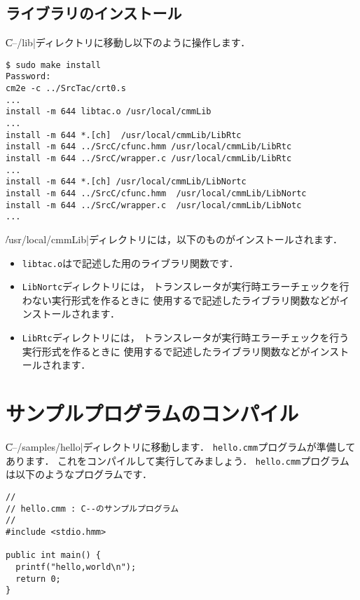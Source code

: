 \subsection{ライブラリのインストール}

\|C--/lib|ディレクトリに移動し以下のように操作します．

\begin{mylist}
\begin{verbatim}
$ sudo make install
Password:
cm2e -c ../SrcTac/crt0.s
...
install -m 644 libtac.o /usr/local/cmmLib
...
install -m 644 *.[ch]  /usr/local/cmmLib/LibRtc
install -m 644 ../SrcC/cfunc.hmm /usr/local/cmmLib/LibRtc
install -m 644 ../SrcC/wrapper.c /usr/local/cmmLib/LibRtc
...
install -m 644 *.[ch] /usr/local/cmmLib/LibNortc
install -m 644 ../SrcC/cfunc.hmm  /usr/local/cmmLib/LibNortc
install -m 644 ../SrcC/wrapper.c  /usr/local/cmmLib/LibNotc
...
\end{verbatim}
\end{mylist}

\|/usr/local/cmmLib|ディレクトリには，以下のものがインストールされます．

\begin{itemize}
\item {\tt libtac.o}は{\cmml}で記述した{\tacos}用のライブラリ関数です．
\item {\tt LibNortc}ディレクトリには，
トランスレータが実行時エラーチェックを行わない実行形式を作るときに
使用する{\cl}で記述したライブラリ関数などがインストールされます．
\item {\tt LibRtc}ディレクトリには，
トランスレータが実行時エラーチェックを行う実行形式を作るときに
使用する{\cl}で記述したライブラリ関数などがインストールされます．
\end{itemize}

\section{サンプルプログラムのコンパイル}

\|C--/samples/hello|ディレクトリに移動します．
{\tt hello.cmm}プログラムが準備してあります．
これをコンパイルして実行してみましょう．
{\tt hello.cmm}プログラムは以下のような{\cmml}プログラムです．

\begin{mylist}
\begin{verbatim}
//
// hello.cmm : C--のサンプルプログラム
//
#include <stdio.hmm>

public int main() {
  printf("hello,world\n");
  return 0;
}
\end{verbatim}
\end{mylist}


